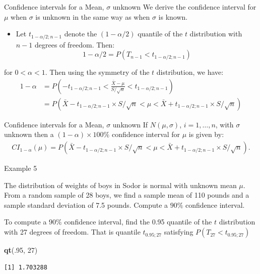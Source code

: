 \documentclass[
  ignorenonframetext,
]{beamer}
\newenvironment{Shaded}{\begin{snugshade}}{\end{snugshade}}
\newcommand{\DecValTok}[1]{\textcolor[rgb]{0.00,0.00,0.81}{#1}}
\newcommand{\FunctionTok}[1]{\textcolor[rgb]{0.13,0.29,0.53}{\textbf{#1}}}
\newcommand{\NormalTok}[1]{#1}
\providecommand{\tightlist}{%
  \setlength{\itemsep}{0pt}\setlength{\parskip}{0pt}}
\begin{document}
\begin{frame}{Confidence intervals for a Mean, \(\sigma\) unknown}
\label{confidence-intervals-for-a-mean-sigma-unknown-6}
We derive the confidence interval for \(\mu\) when \(\sigma\) is unknown
in the same way as when \(\sigma\) is known.

\begin{itemize}
\tightlist
\item
  Let \(t_{1-\alpha/2;n-1}\) denote the \((1-\alpha/2)\) quantile of the
  \(t\) distribution with \(n-1\) degrees of freedom. Then:
  \[1-\alpha/2=P(T_{n-1}<t_{1-\alpha/2;n-1})\]
\end{itemize}

for \(0<\alpha<1\). Then using the symmetry of the \(t\) distribution,
we have: \[\begin{array}{ll}
1-\alpha&=P\left(-t_{1-\alpha/2;n-1}< \frac{\bar{X}-\mu}{S/\sqrt{n}}<t_{1-\alpha/2;n-1}\right)\\
&=P\left(\bar{X}-t_{1-\alpha/2;n-1}\times S/\sqrt{n}<\mu<\bar{X}+t_{1-\alpha/2;n-1}\times S/\sqrt{n}\right)
\end{array}\]
\end{frame}

\begin{frame}{Confidence intervals for a Mean, \(\sigma\) unknown}
\label{confidence-intervals-for-a-mean-sigma-unknown-7}
If \(N(\mu, \sigma)\), \(i=1,\ldots, n\), with \(\sigma\) unknown then a
\((1-\alpha)\times 100\%\) confidence interval for \(\mu\) is given by:
\[\begin{array}{ll}
CI_{1-\alpha}(\mu)=P\left(\bar{X}-t_{1-\alpha/2;n-1}\times S/\sqrt{n}<\mu<\bar{X}+t_{1-\alpha/2;n-1}\times S/\sqrt{n}\right).
\end{array}\]
\end{frame}

\begin{frame}[fragile]{Example 5}
\label{example-5}
\begin{tcolorbox}
The distribution of weights of boys in Sodor is normal with unknown mean $\mu$. From a random sample of 28 boys, we find a sample mean of 110 pounds and a sample standard deviation of 7.5 pounds. Compute a $90\%$ confidence interval. 
\end{tcolorbox}

To compute a \(90\%\) confidence interval, find the 0.95 quantile of the
\(t\) distribution with 27 degrees of freedom. That is quantile
\(t_{0.95;27}\) satisfying \(P(T_{27}<t_{0.95;27})\)

\normalsize

\begin{Shaded}
\begin{Highlighting}[]
\FunctionTok{qt}\NormalTok{(.}\DecValTok{95}\NormalTok{, }\DecValTok{27}\NormalTok{)}
\end{Highlighting}
\end{Shaded}

\begin{verbatim}
[1] 1.703288
\end{verbatim}

\normalsize
\end{frame}
\end{document}
